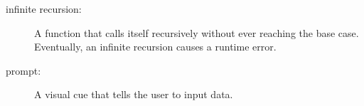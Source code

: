 \begin{description}
\item[infinite recursion:]  A function that calls itself recursively
without ever reaching the base case.  Eventually, an infinite recursion
causes a runtime error.

\item[prompt:]  A visual cue that tells the user to input data.


\end{description}
